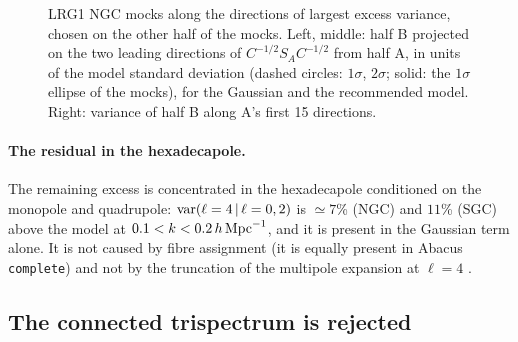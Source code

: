 \begin{figure}
  \centering{}
  \caption{LRG1 NGC mocks along the directions of largest excess variance, chosen on the other half of the mocks. Left, middle: half B projected on the two leading directions of $C^{-1/2}S_AC^{-1/2}$ from half A, in units of the model standard deviation (dashed circles: $1\sigma$, $2\sigma$; solid: the $1\sigma$ ellipse of the mocks), for the Gaussian and the recommended model. Right: variance of half B along A's first 15 directions.}
  \label{fig:clouds}
\end{figure}

\paragraph{The residual in the hexadecapole.} The remaining excess is concentrated in the hexadecapole conditioned on the monopole and quadrupole: ${\rm var}(\ell=4\,|\,\ell=0,2)$ is $\simeq7$\% (NGC) and $11$\% (SGC) above the model at $0.1<k<0.2\,h\,\mathrm{Mpc}^{-1}$, and it is present in the Gaussian term alone. It is not caused by fibre assignment (it is equally present in Abacus \texttt{complete}) and not by the truncation of the multipole expansion at $\ell=4$ .

\subsection{The connected trispectrum is rejected}
\label{sec:t0}

